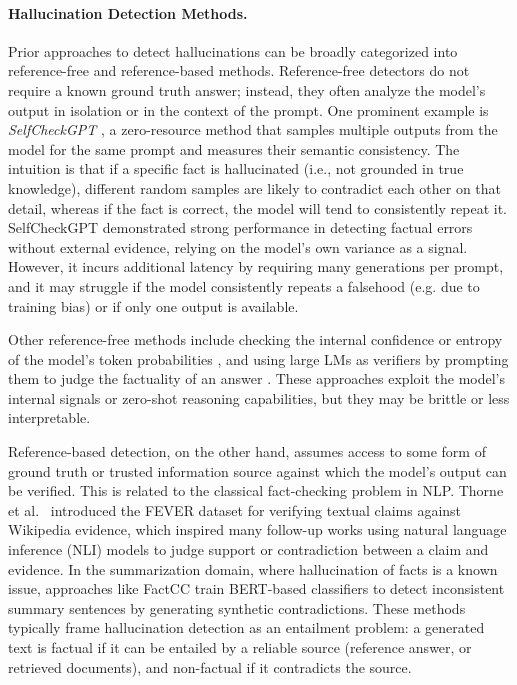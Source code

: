 \documentclass{article}
\begin{document}
\paragraph{Hallucination Detection Methods.}
Prior approaches to detect hallucinations can be broadly categorized into reference-free and reference-based methods. Reference-free detectors do not require a known ground truth answer; instead, they often analyze the model's output in isolation or in the context of the prompt. One prominent example is \textit{SelfCheckGPT} \cite{manakul2023selfcheck}, a zero-resource method that samples multiple outputs from the model for the same prompt and measures their semantic consistency. The intuition is that if a specific fact is hallucinated (i.e., not grounded in true knowledge), different random samples are likely to contradict each other on that detail, whereas if the fact is correct, the model will tend to consistently repeat it. SelfCheckGPT demonstrated strong performance in detecting factual errors without external evidence, relying on the model's own variance as a signal. However, it incurs additional latency by requiring many generations per prompt, and it may struggle if the model consistently repeats a falsehood (e.g. due to training bias) or if only one output is available.

Other reference-free methods include checking the internal confidence or entropy of the model's token probabilities \cite{mielke2022uncertainty}, and using large LMs as verifiers by prompting them to judge the factuality of an answer \cite{kadavath2022llmjudge}. These approaches exploit the model's internal signals or zero-shot reasoning capabilities, but they may be brittle or less interpretable.

Reference-based detection, on the other hand, assumes access to some form of ground truth or trusted information source against which the model's output can be verified. This is related to the classical fact-checking problem in NLP. Thorne et al.~\cite{thorne2018fever} introduced the FEVER dataset for verifying textual claims against Wikipedia evidence, which inspired many follow-up works using natural language inference (NLI) models to judge support or contradiction between a claim and evidence. In the summarization domain, where hallucination of facts is a known issue, approaches like FactCC \cite{kryscinski2020factcc} train BERT-based classifiers to detect inconsistent summary sentences by generating synthetic contradictions. These methods typically frame hallucination detection as an entailment problem: a generated text is factual if it can be entailed by a reliable source (reference answer, or retrieved documents), and non-factual if it contradicts the source.
\end{document}
